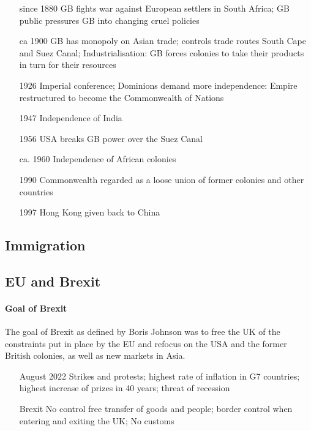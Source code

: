 \documentclass[10pt]{article}
\begin{document}
\begin{itemize}[leftmargin=5pt+]
\item[since 1880] GB fights war against European settlers in South Africa; GB public pressures GB into changing cruel policies
\item[ca 1900] GB has monopoly on Asian trade; controls trade routes South Cape and Suez Canal; Industrialisation: GB forces colonies to take their products in turn for their resources
\item[1926] Imperial conference; Dominions demand more independence: Empire restructured to become the Commonwealth of Nations 
\item[1947] Independence of India
\item[1956] USA breaks GB power over the Suez Canal
\item[ca. 1960] Independence of African colonies
\item[1990] Commonwealth regarded as a loose union of former colonies and other countries
\item[1997] Hong Kong given back to China 
\end{itemize}
\subsection{Immigration}
\label{sec:uk/immig}
\subsection{EU and Brexit}
\label{sec:uk/brexit}
\setcounter{sidenote}{1}

\paragraph{Goal of Brexit}
\label{par:uk/brexit/goal}
The goal of Brexit as defined by Boris Johnson was to free the UK of the constraints
put in place by the EU and refocus on the USA and the former British colonies, as well as
new markets in Asia.

\begin{itemize}[leftmargin=5pt+]
\item [August 2022] Strikes and protests; highest rate of inflation in G7 countries;
highest increase of prizes in 40 years; threat of recession 
\item [Brexit] No control free transfer of goods and people; border control when entering and exiting the UK; No customs 
\end{itemize}
\end{document}
